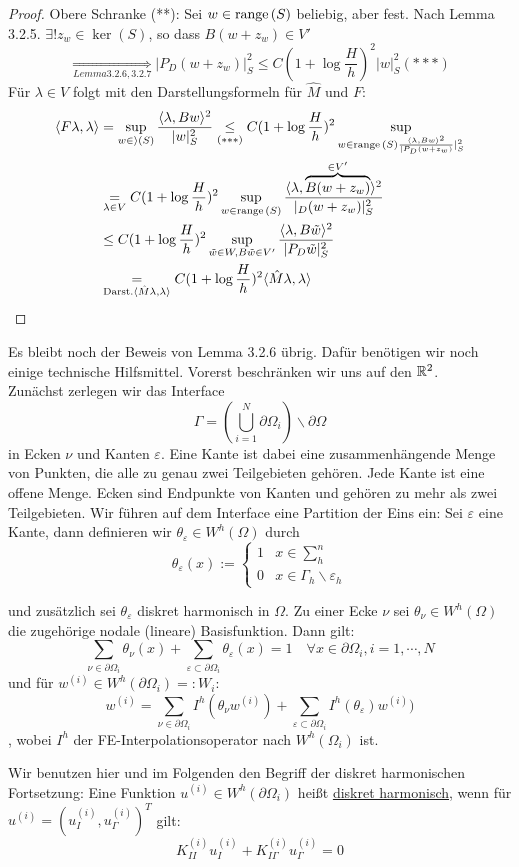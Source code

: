 \begin{proof}
  Obere Schranke (**):
Sei $w\in\textnormal{range}\,(S)$ beliebig, aber fest. Nach Lemma 3.2.5. $\exists! z_w\in\ker(S)$, so dass $B(w+z_w)\in V'$
\[
  \underset{Lemma 3.2.6,3.2.7}{\Longrightarrow} |P_D(w+z_w)|_S^2 \leq C(1+\log \frac{H}{h})^2 |w|_S^2 (***)
\]
Für $\lambda\in V$ folgt mit den Darstellungsformeln für $\hat{M}$ und $F$: 
\begin{align*}
  \langle F\lambda,\lambda\rangle &= \sup_{w\in\rangle(S)}\frac{\langle\lambda,Bw\rangle^2}{|w|_S^2} \underset{(***)}{\leq} C(1+\log \frac{H}{h})^2 \sup_{w\in\textnormal{range}\,(S)\frac{\langle\lambda,Bw\rangle^2}{|P_D(w+z_w)}|_S^2}\\
  &\underset{\lambda\in V}{=} C(1+\log \frac{H}{h})^2 \sup_{w\in\textnormal{range}\,(S)} \frac{\langle\lambda,\overbrace{B(w+z_w)}^{\in V'}\rangle^2}{|_D(w+z_w)|_S^2}\\
  &\leq C(1+\log \frac{H}{h})^2 \sup_{\tilde{w}\in W, B\tilde{w}\in V'} \frac{\langle\lambda,B\tilde{w}\rangle^2}{|P_D\tilde{w}|_S^2}\\
  &\underset{\text{Darst.} \langle\hat{M}\lambda,\lambda\rangle}{=} C(1+\log \frac{H}{h})^2 \langle\hat{M}\lambda,\lambda\rangle
\end{align*}
\end{proof}

Es bleibt noch der Beweis von Lemma 3.2.6 übrig. Dafür benötigen wir noch einige technische Hilfsmittel. Vorerst beschränken wir uns auf den $\mathbb{R}^2$. \\

Zunächst zerlegen wir das Interface 
\[
  \Gamma = \left( \bigcup_{i=1}^N \partial\Omega_i \right) \backslash \partial\Omega
\]
in Ecken $\nu$ und Kanten $\varepsilon$. Eine Kante ist dabei eine zusammenhängende Menge von Punkten, die alle zu genau zwei Teilgebieten gehören. Jede Kante ist eine offene Menge. Ecken sind Endpunkte von Kanten und gehören zu mehr als zwei Teilgebieten. Wir führen auf dem Interface eine Partition der Eins ein: 
Sei $\varepsilon$ eine Kante, dann definieren wir $\theta_{\varepsilon} \in W^h(\Omega)$ durch
\[
  \theta_{\varepsilon}(x):= 
  \begin{cases}
    1 &x\in \sum_h^n\\
    0 &x\in \Gamma_h\backslash\varepsilon_h
  \end{cases}
\]

und zusätzlich sei $\theta_\varepsilon$ diskret harmonisch in $\Omega$. Zu einer Ecke $\nu$ sei $\theta_\nu\in W^h(\Omega)$ die zugehörige nodale (lineare) Basisfunktion. Dann gilt: 
\[
  \sum_{\nu\in\partial\Omega_i} \theta_\nu(x) + \sum_{\varepsilon\subset\partial\Omega_i} \theta_\varepsilon(x) =1 \quad \forall x\in \partial\Omega_i, i=1,\cdots,N
\]
und für $w^{(i)}\in W^h(\partial\Omega_i)=: W_i$:
\[
  w^{(i)}=\sum_{\nu\in\partial\Omega_i} I^h(\theta_\nu w^{(i)})+\sum_{\varepsilon\subset\partial\Omega_i} I^h(\theta_\varepsilon)w^{(i)})
\],
wobei $I^h$ der FE-Interpolationsoperator nach $W^h(\Omega_i)$ ist. 


Wir benutzen hier und im Folgenden den Begriff der diskret harmonischen Fortsetzung: 
Eine Funktion $u^{(i)}\in W^h(\partial\Omega_i)$ heißt \underline{diskret harmonisch}, wenn für $u^{(i)}=(u_I^{(i)},u_\Gamma^{(i)})^T$ gilt:
\[
  K_{II}^{(i)}u_I^{(i)}+K_{I\Gamma}^{(i)}u_\Gamma^{(i)} = 0 
\]
